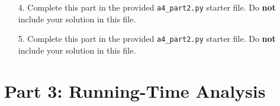 \documentclass[fontsize=11pt]{article}
\newcommand{\N}{\mathbb{N}}
\begin{document}
\begin{enumerate}
\begin{enumerate}
\begin{proof}
To prove Loop Invariant 4, let $k \in \N$, $0 \leq k \leq N[-1]$ and $k$ is coprime to $2$ and $3$.\\
By Lemma 2, $\exists n \in \N \text{ s.t. } k = 6n + 1 \lor k = 6n + 5$. Then either $N[2n] = k$ or $N[2n + 1] = k$.\\
In addition, because $k \leq N[-1]$, the index of $k$ must be less than $|N| - 1$, by Loop Invariant 3 ($N$ is increasing).
\end{proof}
\end{enumerate}

\item[4.]
Complete this part in the provided \texttt{a4\_part2.py} starter file.
Do \textbf{not} include your solution in this file.

\item[5.]
Complete this part in the provided \texttt{a4\_part2.py} starter file.
Do \textbf{not} include your solution in this file.
\end{enumerate}

\newpage

\section*{Part 3: Running-Time Analysis}
\end{document}
